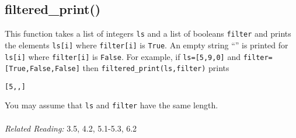 \documentclass{article}
\begin{document}
\subsection{filtered\_print()}
This function takes a list of integers \texttt{ls} and a list of booleans \texttt{filter} and prints the elements \texttt{ls[i]} where \texttt{filter[i]} is \texttt{True}. An empty string ``'' is printed for \texttt{ls[i]} where \texttt{filter[i]} is \texttt{False}. For example, if \texttt{ls=[5,9,0]} and \texttt{filter=[True,False,False]} then \texttt{filtered\_print(ls,filter)} prints
\begin{verbatim}
[5,,]
\end{verbatim}
You may assume that \texttt{ls} and \texttt{filter} have the same length.\\\\
\textit{Related Reading:} 3.5, 4.2, 5.1-5.3, 6.2
\end{document}
